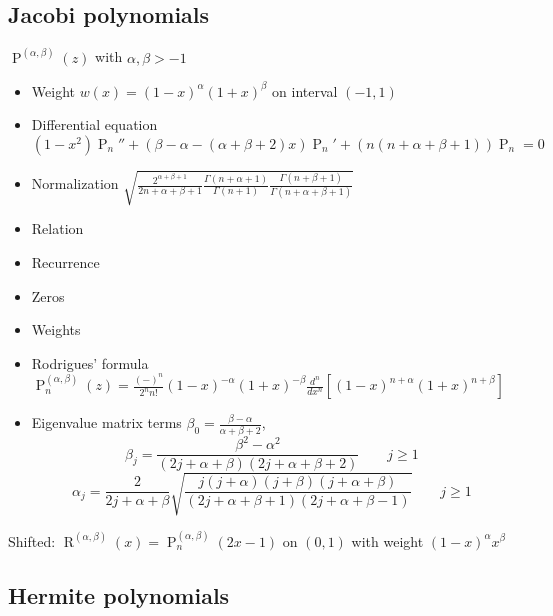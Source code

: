 \documentclass[10pt,dvipdfmx,letterpaper,twoside]{article}
\let\O=\operatorname
\let\al=\alpha
\let\Gam=\Gamma
\begin{document}
\subsection{Jacobi polynomials}
$\O{P}^{(\al,\beta)}(z)$ with $\al,\beta>-1$
\begin{itemize}
\item Weight $w(x) = (1-x)^\al(1+x)^\beta$ on interval $(-1,1)$
\item Differential equation $\left(1-x^2\right) \O{P}_n'' + \left(\beta-\al-(\al+\beta+2)x\right) \O{P}_n' + \left(n(n+\al+\beta+1)\right) \O{P}_n = 0$
\item Normalization $\sqrt{\frac{2^{\al+\beta+1}}{2n+\al+\beta+1} \frac{\Gam(n+\al+1)}{\Gam(n+1)} \frac{\Gam(n+\beta+1)}{\Gam(n+\al+\beta+1)}}$
\item Relation 
\item Recurrence
\item Zeros
\item Weights
\item Rodrigues' formula $\O{P}^{(\al,\beta)}_n(z) = \frac{(-)^n}{2^n n!}(1-x)^{-\al}(1+x)^{-\beta}\frac{d^n}{dx^n}\left[ (1-x)^{n+\al}(1+x)^{n+\beta} \right]$
\item Eigenvalue matrix terms $\beta_0 = \frac{\beta-\al}{\al+\beta+2}$,
    \[ \beta_j = \frac{\beta^2-\al^2}{(2j+\al+\beta)(2j+\al+\beta+2)} \qquad j\geq1 \]
    \[ \al_j = \frac{2}{2j+\al+\beta}\sqrt{\frac{j(j+\al)(j+\beta)(j+\al+\beta)}{(2j+\al+\beta+1)(2j+\al+\beta-1)}} \qquad j\geq1 \]
\end{itemize}
Shifted: $\O{R}^{(\al,\beta)}(x)=\O{P}^{(\al,\beta)}_n(2x-1)$ on $(0,1)$ with weight $(1-x)^\al x^\beta$

\subsection{Hermite polynomials}

\end{document}
